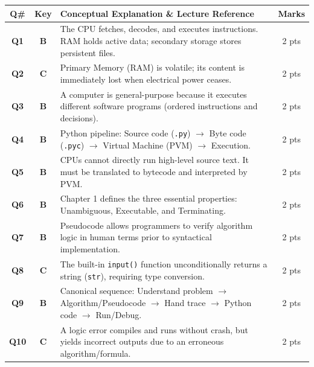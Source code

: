 \documentclass[11pt,a4paper]{article}
\begin{document}
\begin{center}
\renewcommand{\arraystretch}{1.4}
\begin{tabularx}{\textwidth}{|c|c|X|c|}
\hline
\textbf{Q\#} & \textbf{Key} & \textbf{Conceptual Explanation \& Lecture Reference} & \textbf{Marks} \\
\hline
\textbf{Q1} & \textbf{B} & The CPU fetches, decodes, and executes instructions. RAM holds active data; secondary storage stores persistent files. & 2 pts \\
\hline
\textbf{Q2} & \textbf{C} & Primary Memory (RAM) is volatile; its content is immediately lost when electrical power ceases. & 2 pts \\
\hline
\textbf{Q3} & \textbf{B} & A computer is general-purpose because it executes different software programs (ordered instructions and decisions). & 2 pts \\
\hline
\textbf{Q4} & \textbf{B} & Python pipeline: Source code (\texttt{.py}) $\rightarrow$ Byte code (\texttt{.pyc}) $\rightarrow$ Virtual Machine (PVM) $\rightarrow$ Execution. & 2 pts \\
\hline
\textbf{Q5} & \textbf{B} & CPUs cannot directly run high-level source text. It must be translated to bytecode and interpreted by PVM. & 2 pts \\
\hline
\textbf{Q6} & \textbf{B} & Chapter 1 defines the three essential properties: Unambiguous, Executable, and Terminating. & 2 pts \\
\hline
\textbf{Q7} & \textbf{B} & Pseudocode allows programmers to verify algorithm logic in human terms prior to syntactical implementation. & 2 pts \\
\hline
\textbf{Q8} & \textbf{C} & The built-in \texttt{input()} function unconditionally returns a string (\texttt{str}), requiring type conversion. & 2 pts \\
\hline
\textbf{Q9} & \textbf{B} & Canonical sequence: Understand problem $\rightarrow$ Algorithm/Pseudocode $\rightarrow$ Hand trace $\rightarrow$ Python code $\rightarrow$ Run/Debug. & 2 pts \\
\hline
\textbf{Q10} & \textbf{C} & A logic error compiles and runs without crash, but yields incorrect outputs due to an erroneous algorithm/formula. & 2 pts \\
\hline
\end{tabularx}
\end{center}

\vspace{0.3cm}

\end{document}
